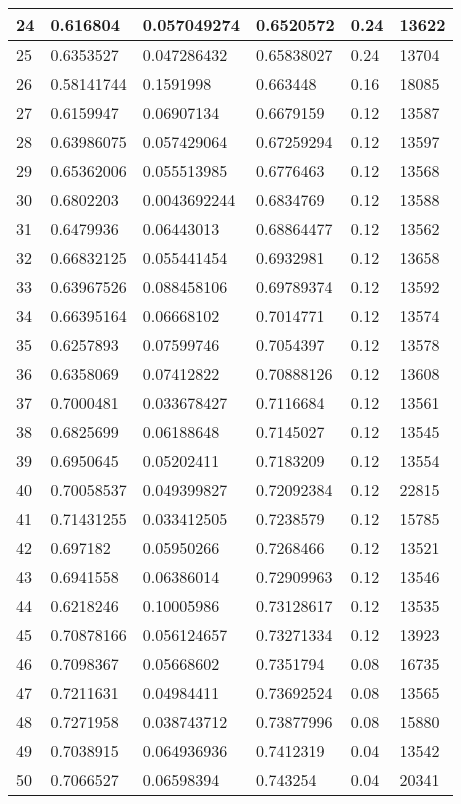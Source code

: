\begin{longtable}{|l|l|l|l|l|l|}
24 & 0.616804 & 0.057049274 & 0.6520572 & 0.24 & 13622 \\ \hline 
25 & 0.6353527 & 0.047286432 & 0.65838027 & 0.24 & 13704 \\ \hline 
26 & 0.58141744 & 0.1591998 & 0.663448 & 0.16 & 18085 \\ \hline 
27 & 0.6159947 & 0.06907134 & 0.6679159 & 0.12 & 13587 \\ \hline 
28 & 0.63986075 & 0.057429064 & 0.67259294 & 0.12 & 13597 \\ \hline 
29 & 0.65362006 & 0.055513985 & 0.6776463 & 0.12 & 13568 \\ \hline 
30 & 0.6802203 & 0.0043692244 & 0.6834769 & 0.12 & 13588 \\ \hline 
31 & 0.6479936 & 0.06443013 & 0.68864477 & 0.12 & 13562 \\ \hline 
32 & 0.66832125 & 0.055441454 & 0.6932981 & 0.12 & 13658 \\ \hline 
33 & 0.63967526 & 0.088458106 & 0.69789374 & 0.12 & 13592 \\ \hline 
34 & 0.66395164 & 0.06668102 & 0.7014771 & 0.12 & 13574 \\ \hline 
35 & 0.6257893 & 0.07599746 & 0.7054397 & 0.12 & 13578 \\ \hline 
36 & 0.6358069 & 0.07412822 & 0.70888126 & 0.12 & 13608 \\ \hline 
37 & 0.7000481 & 0.033678427 & 0.7116684 & 0.12 & 13561 \\ \hline 
38 & 0.6825699 & 0.06188648 & 0.7145027 & 0.12 & 13545 \\ \hline 
39 & 0.6950645 & 0.05202411 & 0.7183209 & 0.12 & 13554 \\ \hline 
40 & 0.70058537 & 0.049399827 & 0.72092384 & 0.12 & 22815 \\ \hline 
41 & 0.71431255 & 0.033412505 & 0.7238579 & 0.12 & 15785 \\ \hline 
42 & 0.697182 & 0.05950266 & 0.7268466 & 0.12 & 13521 \\ \hline 
43 & 0.6941558 & 0.06386014 & 0.72909963 & 0.12 & 13546 \\ \hline 
44 & 0.6218246 & 0.10005986 & 0.73128617 & 0.12 & 13535 \\ \hline 
45 & 0.70878166 & 0.056124657 & 0.73271334 & 0.12 & 13923 \\ \hline 
46 & 0.7098367 & 0.05668602 & 0.7351794 & 0.08 & 16735 \\ \hline 
47 & 0.7211631 & 0.04984411 & 0.73692524 & 0.08 & 13565 \\ \hline 
48 & 0.7271958 & 0.038743712 & 0.73877996 & 0.08 & 15880 \\ \hline 
49 & 0.7038915 & 0.064936936 & 0.7412319 & 0.04 & 13542 \\ \hline 
50 & 0.7066527 & 0.06598394 & 0.743254 & 0.04 & 20341 \\ \hline 
\end{longtable}